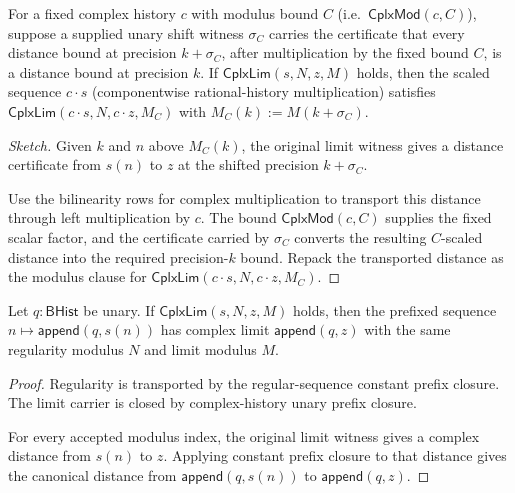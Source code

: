 \begin{theorem}
\label{thm:cplx-lim-scalar}
For a fixed complex history $c$ with modulus bound $C$ (i.e.\ $\mathsf{CplxMod}(c, C)$), suppose a supplied unary shift witness $\sigma_C$ carries the certificate that every distance bound at precision $k+\sigma_C$, after multiplication by the fixed bound $C$, is a distance bound at precision $k$. If $\mathsf{CplxLim}(s, N, z, M)$ holds, then the scaled sequence $c \cdot s$ (componentwise rational-history multiplication) satisfies $\mathsf{CplxLim}(c \cdot s, N, c \cdot z, M_C)$ with $M_C(k) := M(k+\sigma_C)$.
\end{theorem}
\begin{proof}[Sketch]
Given $k$ and $n$ above $M_C(k)$, the original limit witness gives a distance certificate from $s(n)$ to $z$ at the shifted precision $k+\sigma_C$.

Use the bilinearity rows for complex multiplication to transport this distance through left multiplication by $c$. The bound $\mathsf{CplxMod}(c,C)$ supplies the fixed scalar factor, and the certificate carried by $\sigma_C$ converts the resulting $C$-scaled distance into the required precision-$k$ bound. Repack the transported distance as the modulus clause for $\mathsf{CplxLim}(c \cdot s,N,c \cdot z,M_C)$.
\end{proof}

\begin{theorem}
\label{thm:complex-limit-prepend-constant-closed}
Let $q:\mathsf{BHist}$ be unary. If $\mathsf{CplxLim}(s,N,z,M)$ holds, then
the prefixed sequence $n\mapsto\mathsf{append}(q,s(n))$ has complex limit
$\mathsf{append}(q,z)$ with the same regularity modulus $N$ and limit modulus
$M$.
\end{theorem}
\begin{proof}
Regularity is transported by the regular-sequence constant prefix closure. The
limit carrier is closed by complex-history unary prefix closure.

For every accepted modulus index, the original limit witness gives a complex
distance from $s(n)$ to $z$. Applying constant prefix closure to that distance
gives the canonical distance from $\mathsf{append}(q,s(n))$ to
$\mathsf{append}(q,z)$.
\end{proof}

